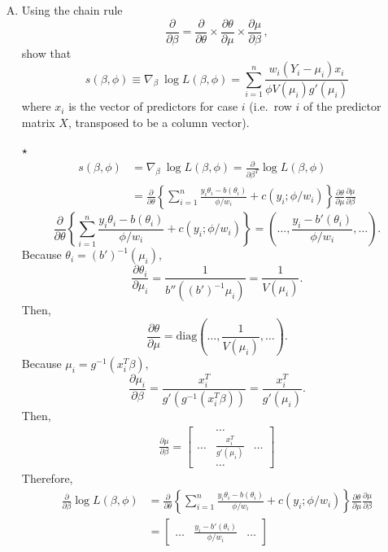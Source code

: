 \documentclass[11pt]{article}
\newcommand{\jie}{$\star$ }
\begin{document}
\begin{enumerate}[(A)]

\item Using the chain rule
$$
\frac{\partial}{\partial \beta} = \frac{\partial}{\partial \theta} \times \frac{\partial \theta}{\partial \mu } \times \frac{\partial \mu}{\partial \beta} \, ,
$$
show that 
$$
s(\beta, \phi) \equiv \nabla_\beta \  \log L(\beta, \phi)  = \sum_{i=1}^n \frac{w_i(Y_i - \mu_i) x_i}{ \phi V(\mu_i) g'(\mu_i)}
$$
where $x_i$ is the vector of predictors for case $i$ (i.e.~row $i$ of the predictor matrix $X$, transposed to be a column vector). 

\bigskip
\jie
\begin{align*}
    s(\beta, \phi) &= \nabla_\beta \  \log L(\beta, \phi) = \frac{\partial}{\partial \beta^T} \log L(\beta, \phi) \\
    &= \frac{\partial}{\partial \theta} \left\{ \sum_{i=1}^n \frac{y_i \theta_i - b(\theta_i)}{\phi/w_i} + c(y_i; \phi/w_i) \right\} \frac{\partial \theta}{\partial \mu} \frac{\partial \mu}{\partial \beta}
\end{align*}
$$\frac{\partial}{\partial \theta} \left\{ \sum_{i=1}^n \frac{y_i \theta_i - b(\theta_i)}{\phi/w_i} + c(y_i; \phi/w_i) \right\} = \left(\dots, \frac{y_i-b'(\theta_i)}{\phi/w_i},\dots \right).$$
Because $\theta_i = (b')^{-1} (\mu_i)$, 
$$\frac{\partial \theta_i}{\partial \mu_i} = \frac{1}{b''((b')^{-1}\mu_i)} = \frac{1}{V(\mu_i)}.$$
Then,
$$\frac{\partial \theta}{\partial \mu} = \text{diag}\left(\dots,\frac{1}{V(\mu_i)},\dots\right).$$
Because $\mu_i = g^{-1}(x_i^T\beta)$,
$$\frac{\partial \mu_i}{\partial \beta} = \frac{x_i^T}{g'(g^{-1}(x_i^T\beta))} = \frac{x_i^T}{g'(\mu_i)}.$$
Then,
\begin{align*}
    \frac{\partial \mu}{\partial \beta} =  
    \begin{bmatrix}
      & \dots & \\
    \dots & \frac{x_i^T}{g'(\mu_i)} & \dots \\
      & \dots &
    \end{bmatrix}
\end{align*}
Therefore,
\begin{align*}
    \frac{\partial}{\partial \beta} \log L(\beta, \phi) &= \frac{\partial}{\partial \theta} \left\{ \sum_{i=1}^n \frac{y_i \theta_i - b(\theta_i)}{\phi/w_i} + c(y_i; \phi/w_i) \right\} \frac{\partial \theta}{\partial \mu} \frac{\partial \mu}{\partial \beta} \\
    &= \begin{bmatrix}
      \dots & \frac{y_i-b'(\theta_i)}{\phi/w_i} & \dots

\end{bmatrix}
\end{align*}
\end{enumerate}
\end{document}
